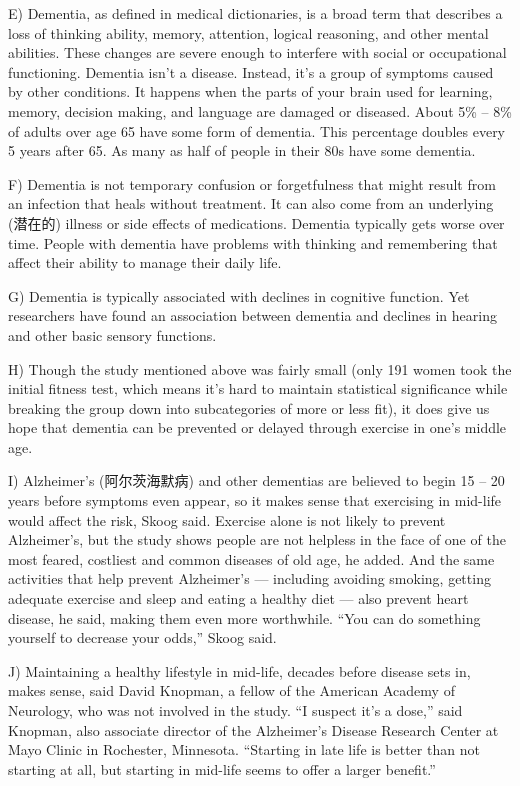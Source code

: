 \documentclass[UTF8,11pt]{ctexart}
\begin{document}
E) Dementia, as defined in medical dictionaries, is a broad term that describes a loss of thinking ability, memory, attention, logical reasoning, and other mental abilities. These changes are severe enough to interfere with social or occupational functioning. Dementia isn’t a disease. Instead, it’s a group of symptoms caused by other conditions. It happens when the parts of your brain used for learning, memory, decision making, and language are damaged or diseased. About 5\% – 8\% of adults over age 65 have some form of dementia. This percentage doubles every 5 years after 65. As many as half of people in their 80s have some dementia.


F) Dementia is not temporary confusion or forgetfulness that might result from an infection that heals without treatment. It can also come from an underlying (潜在的) illness or side effects of medications. Dementia typically gets worse over time. People with dementia have problems with thinking and remembering that affect their ability to manage their daily life.


G) Dementia is typically associated with declines in cognitive function. Yet researchers have found an association between dementia and declines in hearing and other basic sensory functions.


H) Though the study mentioned above was fairly small (only 191 women took the initial fitness test, which means it’s hard to maintain statistical significance while breaking the group down into subcategories of more or less fit), it does give us hope that dementia can be prevented or delayed through exercise in one’s middle age.


I) Alzheimer’s (阿尔茨海默病) and other dementias are believed to begin 15 – 20 years before symptoms even appear, so it makes sense that exercising in mid-life would affect the risk, Skoog said. Exercise alone is not likely to prevent Alzheimer’s, but the study shows people are not helpless in the face of one of the most feared, costliest and common diseases of old age, he added. And the same activities that help prevent Alzheimer’s — including avoiding smoking, getting adequate exercise and sleep and eating a healthy diet — also prevent heart disease, he said, making them even more worthwhile. “You can do something yourself to decrease your odds,” Skoog said.


J) Maintaining a healthy lifestyle in mid-life, decades before disease sets in, makes sense, said David Knopman, a fellow of the American Academy of Neurology, who was not involved in the study. “I suspect it’s a dose,” said Knopman, also associate director of the Alzheimer’s Disease Research Center at Mayo Clinic in Rochester, Minnesota. “Starting in late life is better than not starting at all, but starting in mid-life seems to offer a larger benefit.”
\end{document}
